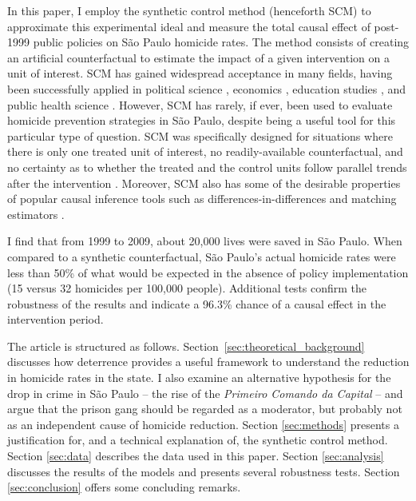 In this paper, I employ the synthetic control method (henceforth SCM) to approximate this experimental ideal and measure the total causal effect of post-1999 public policies on São Paulo homicide rates. The method consists of creating an artificial counterfactual to estimate the impact of a given intervention on a unit of interest. SCM has gained widespread acceptance in many fields, having been successfully applied in political science \citep{abadie2014, montalvo2011}, economics \citep{billmeier2013, coffman2012, jinjarak2013}, education studies \citep{hinrichs2012}, and public health science \citep{heim2014}. However, SCM has rarely, if ever, been used to evaluate homicide prevention strategies in São Paulo, despite being a useful tool for this particular type of question. SCM was specifically designed for situations where there is only one treated unit of interest, no readily-available counterfactual, and no certainty as to whether the treated and the control units follow parallel trends after the intervention \citep{abadie2003, abadie2010, abadie2014}. Moreover, SCM also has some of the desirable properties of popular causal inference tools such as differences-in-differences \citep{angrist2008mostly, bertrand2004much} and matching estimators \citep{dehejia2002propensity, ho2007matching, rubin1973matching, stuart2010matching}. 

I find that from 1999 to 2009, about 20,000 lives were saved in São Paulo. When compared to a synthetic counterfactual, São Paulo's actual homicide rates were less than 50\% of what would be expected in the absence of policy implementation (15 versus 32 homicides per 100,000 people). Additional tests confirm the robustness of the results and indicate a 96.3\% chance of a causal effect in the intervention period. 

The article is structured as follows. Section~\ref{sec:theoretical_background} discusses how deterrence provides a useful framework to understand the reduction in homicide rates in the state. I also examine an alternative hypothesis for the drop in crime in São Paulo -- the rise of the \emph{Primeiro Comando da Capital} -- and argue that the prison gang should be regarded as a moderator, but probably not as an independent cause of homicide reduction. Section \ref{sec:methods} presents a justification for, and a technical explanation of, the synthetic control method. Section \ref{sec:data} describes the data used in this paper. Section \ref{sec:analysis} discusses the results of the models and presents several robustness tests. Section \ref{sec:conclusion} offers some concluding remarks.

